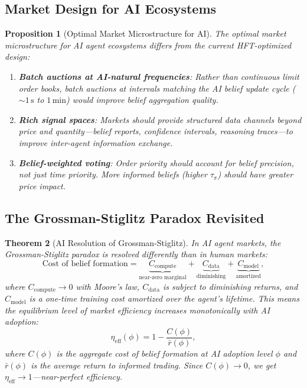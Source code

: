 \documentclass[12pt,a4paper]{article}
\newtheorem{theorem}{Theorem}[section]
\newtheorem{proposition}[theorem]{Proposition}
\theoremstyle{definition}
\begin{document}
\subsection{Market Design for AI Ecosystems}

\begin{proposition}[Optimal Market Microstructure for AI]\label{prop:optimal-microstructure}
The optimal market microstructure for AI agent ecosystems differs from the current HFT-optimized design:
\begin{enumerate}
  \item \textbf{Batch auctions at AI-natural frequencies}: Rather than continuous limit order books, batch auctions at intervals matching the AI belief update cycle ($\sim 1\,\mathrm{s}$ to $1\,\mathrm{min}$) would improve belief aggregation quality.

  \item \textbf{Rich signal spaces}: Markets should provide structured data channels beyond price and quantity---belief reports, confidence intervals, reasoning traces---to improve inter-agent information exchange.

  \item \textbf{Belief-weighted voting}: Order priority should account for belief precision, not just time priority. More informed beliefs (higher $\tau_\pi$) should have greater price impact.
\end{enumerate}
\end{proposition}

\subsection{The Grossman-Stiglitz Paradox Revisited}

\begin{theorem}[AI Resolution of Grossman-Stiglitz]\label{thm:gs-resolution}
In AI agent markets, the Grossman-Stiglitz paradox is resolved differently than in human markets:
\begin{equation}
  \text{Cost of belief formation} = \underbrace{C_{\mathrm{compute}}}_{\text{near-zero marginal}} + \underbrace{C_{\mathrm{data}}}_{\text{diminishing}} + \underbrace{C_{\mathrm{model}}}_{\text{amortized}},
\end{equation}
where $C_{\mathrm{compute}} \to 0$ with Moore's law, $C_{\mathrm{data}}$ is subject to diminishing returns, and $C_{\mathrm{model}}$ is a one-time training cost amortized over the agent's lifetime. This means the equilibrium level of market efficiency increases monotonically with AI adoption:
\begin{equation}
  \eta_{\mathrm{eff}}(\phi) = 1 - \frac{C(\phi)}{\bar{r}(\phi)},
\end{equation}
where $C(\phi)$ is the aggregate cost of belief formation at AI adoption level $\phi$ and $\bar{r}(\phi)$ is the average return to informed trading. Since $C(\phi) \to 0$, we get $\eta_{\mathrm{eff}} \to 1$---near-perfect efficiency.
\end{theorem}
\end{document}
